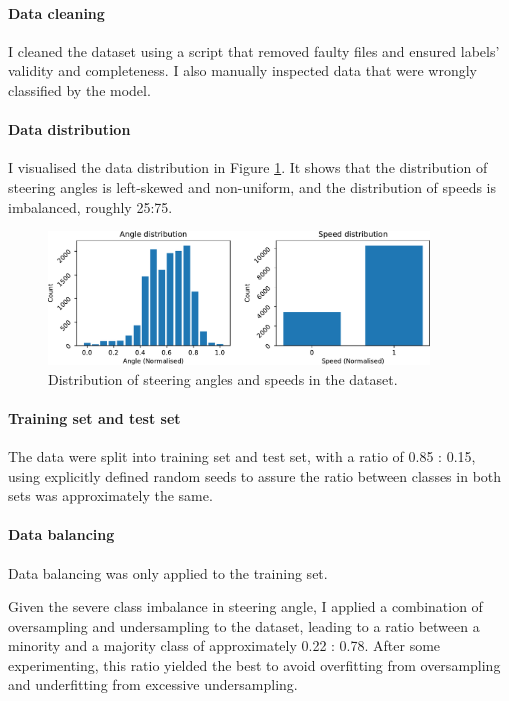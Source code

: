 \documentclass{article}
\begin{document}
\paragraph{Data cleaning}
I cleaned the dataset using a script that removed faulty files and ensured labels' validity and completeness. I also manually inspected data that were wrongly classified by the model.

\paragraph{Data distribution}
I visualised the data distribution in Figure \ref{fig:angle_speed_distribution}. It shows that the distribution of steering angles is left-skewed and non-uniform, and the distribution of speeds is imbalanced, roughly 25:75.

\begin{figure}[h]
  \centering
  \includegraphics[width=0.9\textwidth]{figures/angle_speed_distribution.pdf}
  \caption{Distribution of steering angles and speeds in the dataset.}
  \label{fig:angle_speed_distribution}
\end{figure}

\paragraph{Training set and test set}
\label{sec:train_test_split}
The data were split into training set and test set, with a ratio of 0.85 : 0.15, using explicitly defined random seeds to assure the ratio between classes in both sets was approximately the same.

\paragraph{Data balancing}
Data balancing was only applied to the training set.

Given the severe class imbalance in steering angle, I applied a combination of oversampling and undersampling to the dataset, leading to a ratio between a minority and a majority class of approximately 0.22 : 0.78. After some experimenting, this ratio yielded the best to avoid overfitting from oversampling and underfitting from excessive undersampling.
\end{document}
